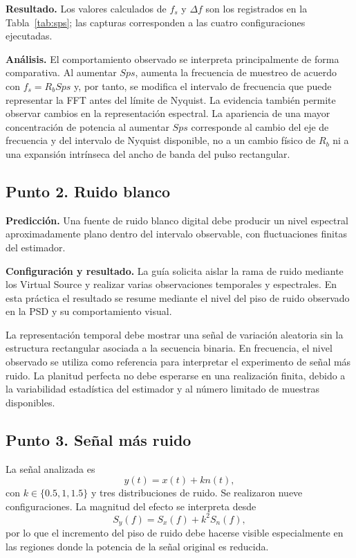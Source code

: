 \documentclass[journal]{IEEEtran}
\begin{document}
\textbf{Resultado.} Los valores calculados de $f_s$ y $\Delta f$ son los registrados en la Tabla~\ref{tab:sps}; las capturas corresponden a las cuatro configuraciones ejecutadas.\par
\textbf{Análisis.} El comportamiento observado se interpreta principalmente de forma comparativa. Al aumentar $Sps$, aumenta la frecuencia de muestreo de acuerdo con $f_s=R_bSps$ y, por tanto, se modifica el intervalo de frecuencia que puede representar la FFT antes del límite de Nyquist. La evidencia también permite observar cambios en la representación espectral. La apariencia de una mayor concentración de potencia al aumentar $Sps$ corresponde al cambio del eje de frecuencia y del intervalo de Nyquist disponible, no a un cambio físico de $R_b$ ni a una expansión intrínseca del ancho de banda del pulso rectangular.

\subsection{Punto 2. Ruido blanco}
\textbf{Predicción.} Una fuente de ruido blanco digital debe producir un nivel espectral aproximadamente plano dentro del intervalo observable, con fluctuaciones finitas del estimador.\par
\textbf{Configuración y resultado.} La guía solicita aislar la rama de ruido mediante los Virtual Source y realizar varias observaciones temporales y espectrales. En esta práctica el resultado se resume mediante el nivel del piso de ruido observado en la PSD y su comportamiento visual.


La representación temporal debe mostrar una señal de variación aleatoria sin la estructura rectangular asociada a la secuencia binaria. En frecuencia, el nivel observado se utiliza como referencia para interpretar el experimento de señal más ruido. La planitud perfecta no debe esperarse en una realización finita, debido a la variabilidad estadística del estimador y al número limitado de muestras disponibles.

\subsection{Punto 3. Señal más ruido}
La señal analizada es
\begin{equation}
y(t)=x(t)+kn(t),
\end{equation}
con $k\in\{0.5,1,1.5\}$ y tres distribuciones de ruido. Se realizaron nueve configuraciones. La magnitud del efecto se interpreta desde
\begin{equation}
S_y(f)=S_x(f)+k^2S_n(f),
\end{equation}
por lo que el incremento del piso de ruido debe hacerse visible especialmente en las regiones donde la potencia de la señal original es reducida.
\end{document}
